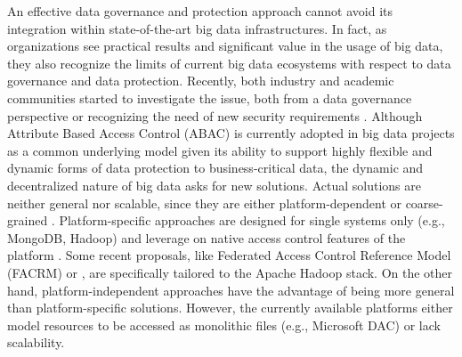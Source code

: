 An effective data governance and protection approach cannot avoid its integration within state-of-the-art big data infrastructures. In fact, as organizations see practical results and significant value in the usage of big data, they also recognize the limits of current big data ecosystems with respect to data governance and data protection. Recently, both industry and academic communities started to investigate the issue, both from a data governance perspective \cite{al2018exploring,aissa2020decide} or recognizing the need of new security requirements \cite{Colombo:JournCybersec:2019}. Although Attribute Based Access Control (ABAC) \cite{NIST:ABAC:2014} is currently adopted in big data projects as a common underlying model given its ability to support highly flexible and dynamic forms of data protection to business-critical data, the dynamic and decentralized nature of big data asks for new solutions. Actual solutions are neither general nor scalable, since they are either platform-dependent or coarse-grained \cite{Colombo:JournCybersec:2019}.
%
Platform-specific approaches are designed for single systems only (e.g., MongoDB, Hadoop) and leverage on native access control features of the platform \cite{rathore2017hadoop,anisetti2018privacy}.
Some recent proposals, like Federated Access Control Reference Model (FACRM) \cite{FederationAC:Journ:2020} or \cite{Sandhu:ABAC:2018,GuptaSandu:2017}, are specifically tailored to the Apache Hadoop stack.
On the other hand, platform-independent approaches have the advantage of being more general than platform-specific solutions. However, the currently available platforms either model resources to be accessed as monolithic files (e.g., Microsoft DAC) or lack scalability.

